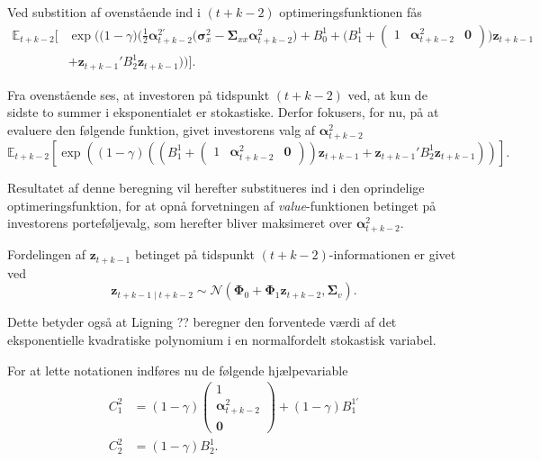 \documentclass[
  a4paper,
  oneside]{memoir}
\begin{document}
Ved substition af ovenstående ind i \((t+k-2)\) optimeringsfunktionen fås
\begin{align*}
\mathbb{E}_{t+k-2}\Big[&\exp\Big(\Big(1-\gamma\Big)  \Big(\frac{1}{2}\bm{\alpha}_{t+k-2}^{2\prime} \Big(\bm{\sigma}_x^2 - \bm{\Sigma}_{xx} \bm{\alpha}_{t+k-2}^{2}\Big) + B_0^1 + \Big(B_1^1 + \begin{pmatrix} 1 & \bm{\alpha}_{t+k-2}^{2} & \bm{0}\end{pmatrix} \Big) \bm{z}_{t+k-1}\\
                   &+ \bm{z}_{t+k-1}'B_2^1 \bm{z}_{t+k-1} \Big)\Big)\Big].
\end{align*}

Fra ovenstående ses, at investoren på tidspunkt \((t+k-2)\) ved, at kun de sidste to summer i eksponentialet er stokastiske. Derfor fokusers, for nu, på at evaluere den følgende funktion, givet investorens valg af \(\bm{\alpha}_{t+k-2}^{2}\)
\[\mathbb{E}_{t+k-2}[ \exp\left( \left(1-\gamma\right) \left(\left(B_1^1 + \begin{pmatrix} 1 & \bm{\alpha}_{t+k-2}^{2} & \bm{0}\end{pmatrix} \right) \bm{z}_{t+k-1} + \bm{z}_{t+k-1}'B_2^1 \bm{z}_{t+k-1}  \right)\right) ].\]

Resultatet af denne beregning vil herefter substitueres ind i den oprindelige optimeringsfunktion, for at opnå forvetningen af \emph{value}-funktionen betinget på investorens porteføljevalg, som herefter bliver maksimeret over \(\bm{\alpha}_{t+k-2}^{2}\).

Fordelingen af \(\bm{z}_{t+k-1}\) betinget på tidspunkt \((t+k-2)\)-informationen er givet ved
\[\bm{z}_{t+k-1\mid t+k-2}\sim\mathcal{N}\left(\bm{\Phi}_0+\bm{\Phi}_1\bm{z}_{t+k-2},\bm{\Sigma}_v\right).\]

Dette betyder også at Ligning ?? beregner den forventede værdi af det eksponentielle kvadratiske polynomium i en normalfordelt stokastisk variabel.

For at lette notationen indføres nu de følgende hjælpevariable
\begin{align*}
C_1^2 &= (1-\gamma) \begin{pmatrix} 1\\ \bm{\alpha}_{t+k-2}^{2} \\ \bm{0} \end{pmatrix} + (1-\gamma) B_1^{1\prime}\\
C_2^2 &= (1-\gamma) B_2^1.
\end{align*}
\end{document}
